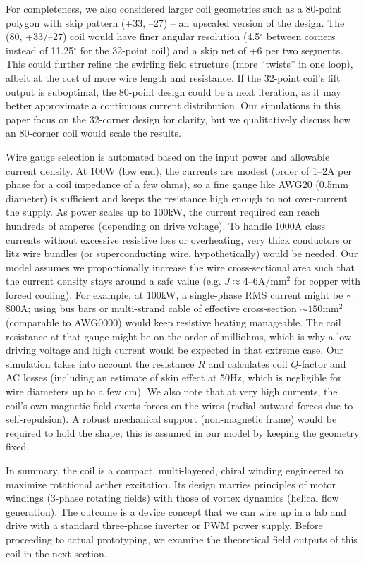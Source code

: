 \documentclass[twocolumn,aps,pre,floatfix,nofootinbib]{revtex4-2}
\begin{document}
For completeness, we also considered larger coil geometries such as a 80-point polygon with skip pattern (+33, –27) – an upscaled version of the design. The (80, +33/–27) coil would have finer angular resolution (4.5$^\circ$ between corners instead of 11.25$^\circ$ for the 32-point coil) and a skip net of +6 per two segments. This could further refine the swirling field structure (more “twists” in one loop), albeit at the cost of more wire length and resistance. If the 32-point coil’s lift output is suboptimal, the 80-point design could be a next iteration, as it may better approximate a continuous current distribution. Our simulations in this paper focus on the 32-corner design for clarity, but we qualitatively discuss how an 80-corner coil would scale the results.


Wire gauge selection is automated based on the input power and allowable current density. At 100W (low end), the currents are modest (order of 1–2A per phase for a coil impedance of a few ohms), so a fine gauge like AWG20 (0.5mm diameter) is sufficient and keeps the resistance high enough to not over-current the supply. As power scales up to 100kW, the current required can reach hundreds of amperes (depending on drive voltage). To handle 1000A class currents without excessive resistive loss or overheating, very thick conductors or litz wire bundles (or superconducting wire, hypothetically) would be needed. Our model assumes we proportionally increase the wire cross-sectional area such that the current density stays around a safe value (e.g. $J \approx 4$–6A/mm$^2$ for copper with forced cooling). For example, at 100kW, a single-phase RMS current might be $\sim$800A; using bus bars or multi-strand cable of effective cross-section $\sim 150$mm$^2$ (comparable to AWG0000) would keep resistive heating manageable. The coil resistance at that gauge might be on the order of milliohms, which is why a low driving voltage and high current would be expected in that extreme case. Our simulation takes into account the resistance $R$ and calculates coil $Q$-factor and AC losses (including an estimate of skin effect at 50Hz, which is negligible for wire diameters up to a few cm). We also note that at very high currents, the coil’s own magnetic field exerts forces on the wires (radial outward forces due to self-repulsion). A robust mechanical support (non-magnetic frame) would be required to hold the shape; this is assumed in our model by keeping the geometry fixed.


In summary, the coil is a compact, multi-layered, chiral winding engineered to maximize rotational aether excitation. Its design marries principles of motor windings (3-phase rotating fields) with those of vortex dynamics (helical flow generation). The outcome is a device concept that we can wire up in a lab and drive with a standard three-phase inverter or PWM power supply. Before proceeding to actual prototyping, we examine the theoretical field outputs of this coil in the next section.
\end{document}
